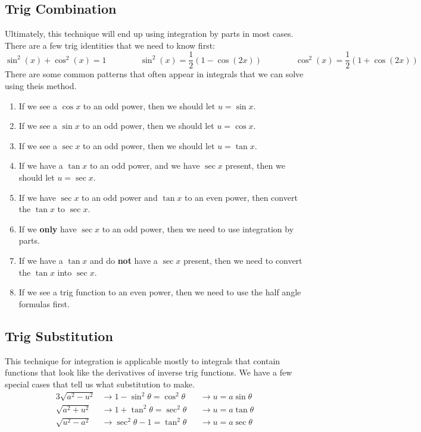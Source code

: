\documentclass{article}
\begin{document}
\subsection{Trig Combination}
Ultimately, this technique will end up using integration by parts in most cases.
There are a few trig identities that we need to know first:
\[
\sin^{2}{(x)} + \cos^{2}{(x)} = 1\qquad\qquad
\sin^{2}{(x)} = \frac{1}{2}(1-\cos{(2x)})\qquad\qquad
\cos^{2}{(x)} = \frac{1}{2}(1+\cos{(2x)})
\]
There are some common patterns that often appear in integrals that we can solve using theis method.
\begin{enumerate}
\item If we see a $\cos{x}$ to an odd power, then we should let $u = \sin{x}$.
\item If we see a $\sin{x}$ to an odd power, then we should let $u = \cos{x}$.
\item If we see a $\sec{x}$ to an odd power, then we should let $u = \tan{x}$.
\item If we have a $\tan{x}$ to an odd power, and we have $\sec{x}$ present, then we should let $u=\sec{x}$.
\item If we have $\sec{x}$ to an odd power and $\tan{x}$ to an even power, then convert the $\tan{x}$ to $\sec{x}$.
\item If we \textbf{only} have $\sec{x}$ to an odd power, then we need to use integration by parts.
\item If we have a $\tan{x}$ and do \textbf{not} have a $\sec{x}$ present, then we need to convert the $\tan{x}$ into $\sec{x}$.
\item If we see a trig function to an even power, then we need to use the half angle formulas first.
\end{enumerate}

\subsection{Trig Substitution}
This technique for integration is applicable mostly to integrals that contain functions that look like the derivatives of inverse trig functions.
We have a few special cases that tell us what substitution to make.
\begin{alignat*}{3}
\sqrt{a^{2} - u^{2}} &\to 1 - \sin^{2}{\theta} = \cos^{2}{\theta} &&\to u = a\sin{\theta}\\
\sqrt{a^{2} + u^{2}} &\to 1 + \tan^{2}{\theta} = \sec^{2}{\theta} &&\to u = a\tan{\theta}\\
\sqrt{u^{2} - a^{2}} &\to \sec^{2}{\theta} - 1 = \tan^{2}{\theta} &&\to u = a\sec{\theta}\\
\end{alignat*}
\end{document}
